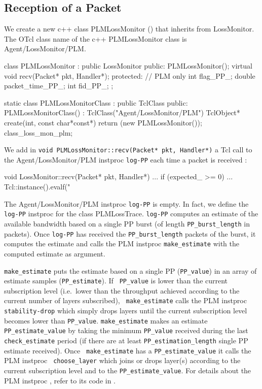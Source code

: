 {\subsection{Reception of a Packet}
\label{sec:PLMReception-Packet}
We create a new c++ class PLMLossMonitor () that
inherits from LossMonitor. The OTcl class name of the c++ PLMLossMonitor class is
Agent/LossMonitor/PLM.
\begin{program}
class PLMLossMonitor : public LossMonitor {
public:
        PLMLossMonitor();
        virtual void recv(Packet* pkt, Handler*);
protected:
        // PLM only
        int flag_PP_;
        double packet_time_PP_;
        int fid_PP_;
};

static class PLMLossMonitorClass : public TclClass {
public:
        PLMLossMonitorClass() : TclClass("Agent/LossMonitor/PLM") {}
        TclObject* create(int, const char*const*) {
                return (new PLMLossMonitor());
        }
} class_loss_mon_plm;

\end{program}

We add in {\tt void PLMLossMonitor::recv(Packet* pkt, Handler*)} a Tcl call to the
  Agent/LossMonitor/PLM instproc {\tt log-PP} each time a packet is received :
\begin{program}
  void LossMonitor::recv(Packet* pkt, Handler*)
  {
    ...
    if (expected_ >= 0) {
      ...
      }
    Tcl::instance().evalf("%
    }
\end{program}

The Agent/LossMonitor/PLM instproc {\tt log-PP} is empty. In fact, we define the {\tt
  log-PP} instproc for the class PLMLossTrace. {\tt log-PP}
computes an estimate of the available bandwidth based on a single PP burst (of
length {\tt PP\_burst\_length} in packets). Once {\tt log-PP} has received the 
  {\tt PP\_burst\_length} packets of the burst, it computes the estimate and
  calls the PLM instproc {\tt make\_estimate} with the computed estimate as
  argument. 

{\tt make\_estimate} puts the estimate based on a single PP
({\tt PP\_value}) in an array of  estimate samples ({\tt PP\_estimate}). If {\tt
  PP\_value} is lower than the current subscription level (i.e.~lower than the
throughput achieved according to the current number of layers subscribed), {\tt
  make\_estimate} calls the PLM instproc {\tt stability-drop} which simply drops
layers until the current subscription level becomes lower than {\tt PP\_value}.
{\tt make\_estimate} makes an estimate {\tt PP\_estimate\_value} by taking the
minimum {\tt PP\_value} received during the last {\tt check\_estimate} period
(if there are at
least {\tt PP\_estimation\_length} single PP estimate received). Once {\tt
  make\_estimate} has a {\tt PP\_estimate\_value} it calls the PLM instproc {\tt
  choose\_layer} which joins or drops layer(s) according to the current subscription
level and to the {\tt PP\_estimate\_value}. For details about the PLM instproc
, refer to its code in .



}
